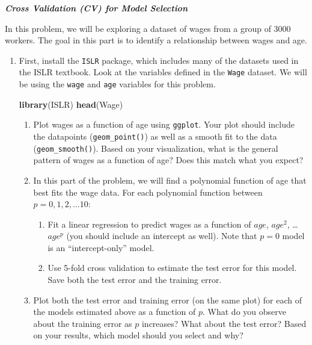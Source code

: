 \documentclass[]{article}
\newenvironment{Shaded}{\begin{snugshade}}{\end{snugshade}}
\newcommand{\KeywordTok}[1]{\textcolor[rgb]{0.13,0.29,0.53}{\textbf{#1}}}
\newcommand{\NormalTok}[1]{#1}
\providecommand{\tightlist}{%
  \setlength{\itemsep}{0pt}\setlength{\parskip}{0pt}}
\begin{document}
\textbf{\emph{Cross Validation (CV) for Model Selection}}

In this problem, we will be exploring a dataset of wages from a group of
3000 workers. The goal in this part is to identify a relationship
between wages and age.

\begin{enumerate}
\def\labelenumi{\arabic{enumi}.}
\setcounter{enumi}{5}
\item
  First, install the \texttt{ISLR} package, which includes many of the
  datasets used in the ISLR textbook. Look at the variables defined in
  the \texttt{Wage} dataset. We will be using the \texttt{wage} and
  \texttt{age} variables for this problem.

\begin{Shaded}
\begin{Highlighting}[]
\KeywordTok{library}\NormalTok{(ISLR)}
\KeywordTok{head}\NormalTok{(Wage)}
\end{Highlighting}
\end{Shaded}

  \begin{enumerate}
  \item
    Plot wages as a function of age using \texttt{ggplot}. Your plot
    should include the datapoints (\texttt{geom\_point()}) as well as a
    smooth fit to the data (\texttt{geom\_smooth()}). Based on your
    visualization, what is the general pattern of wages as a function of
    age? Does this match what you expect?
  \item
    In this part of the problem, we will find a polynomial function of
    age that best fits the wage data. For each polynomial function
    between \(p=0, 1, 2, ... 10\):

    \begin{enumerate}
    \tightlist
    \item
      Fit a linear regression to predict wages as a function of \(age\),
      \(age^2\), \ldots{} \(age^p\) (you should include an intercept as
      well). Note that \(p=0\) model is an ``intercept-only'' model.
    \item
      Use 5-fold cross validation to estimate the test error for this
      model. Save both the test error and the training error.
    \end{enumerate}
  \item
    Plot both the test error and training error (on the same plot) for
    each of the models estimated above as a function of \(p\). What do
    you observe about the training error as \(p\) increases? What about
    the test error? Based on your results, which model should you select
    and why?
  \end{enumerate}


\end{enumerate}
\end{document}

